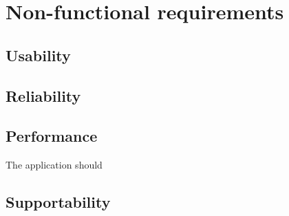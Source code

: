 \documentclass[fontsize=12pt,
               paper=a4,
               twoside=false,
               parskip=half,
               ]{scrartcl}
\begin{document}
\newcommand{\doctitle}{Supplementary Specification}


\tableofcontents

\section{Non-functional requirements}


\subsection{Usability}




\subsection{Reliability}


\subsection{Performance}

The application should 




\subsection{Supportability}

\end{document}
